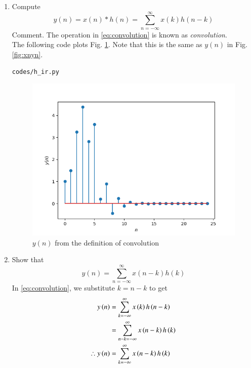 \documentclass[journal,12pt,twocolumn]{IEEEtran}
\theoremstyle{remark}
\begin{document}
\begin{enumerate}[label=\thesection.\arabic*]
\item Compute 
%
\begin{equation}
\label{eq:convolution}
y(n) = x(n)*h(n) = \sum_{n=-\infty}^{\infty}x(k)h(n-k)
\end{equation}
%
Comment. The operation in \eqref{eq:convolution} is known as
{\em convolution}.
%
\\
\solution The following code plots Fig. \ref{fig:ynconv}. Note that this is the same as 
$y(n)$ in  Fig. 
\ref{fig:xnyn}. 
%
\begin{lstlisting}
codes/h_ir.py
\end{lstlisting}
\begin{figure}[ht]
    \centering
    \includegraphics[width=\columnwidth]{figs/conv_y.png}
    \caption{$y(n)$ from the definition of convolution}
    \label{fig:ynconv}
\end{figure}

\item Show that
\begin{equation}
y(n) =  \sum_{n=-\infty}^{\infty}x(n-k)h(k)
\end{equation}
\solution
In \eqref{eq:convolution}, we substitute $k = n - k$ to get
\begin{align}
    y\left(n\right) &= \sum_{k=-\infty}^{\infty}x\left(k\right)h\left(n - k\right) \\
              &= \sum_{n - k=-\infty}^{\infty}x\left(n - k\right)h\left(k\right) \\
    \therefore y\left(n\right) &= \sum_{k=-\infty}^{\infty}x\left(n - k\right)h\left(k\right)
\end{align}
\end{enumerate}
\end{document}
